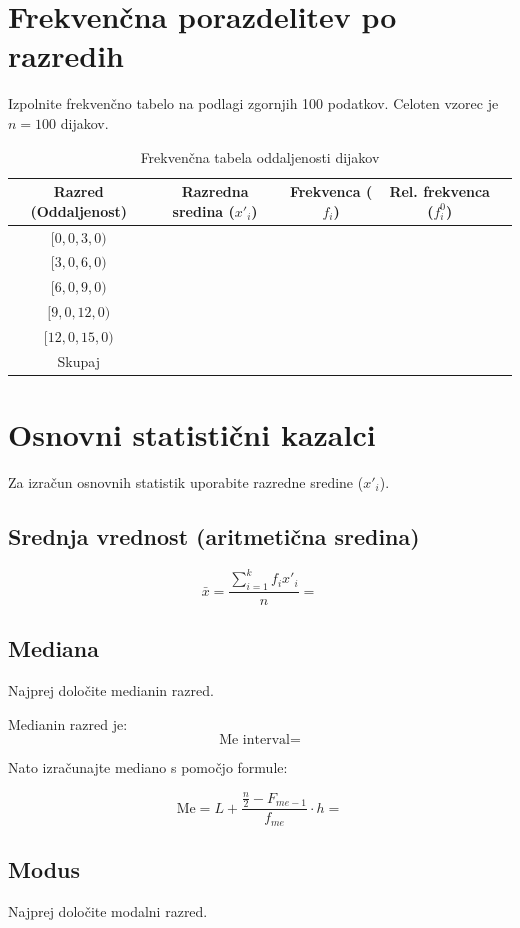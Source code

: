 \documentclass[12pt,a4paper]{article}
\begin{document}
\section{Frekvenčna porazdelitev po razredih}

Izpolnite frekvenčno tabelo na podlagi zgornjih 100 podatkov. Celoten vzorec je $n=100$ dijakov.

\begin{table}[h]
\centering
\caption{Frekvenčna tabela oddaljenosti dijakov}
\begin{tabular}{ccccc}
\toprule
Razred (Oddaljenost)& Razredna sredina ($x'_i$) & Frekvenca ($f_i$) & Rel. frekvenca ($f_i^0$) \\
\midrule
$[0,0, 3,0)$ &  &  &  & \\
\midrule
$[3,0, 6,0)$ &  &  &  & \\
\midrule
$[6,0, 9,0)$ &  &  &  & \\
\midrule
$[9,0, 12,0)$ &  &  &  & \\
\midrule
$[12,0, 15,0)$&  &  &  & \\
\midrule
Skupaj   & \phantom{100} & & \\
\bottomrule
\end{tabular}
\end{table}

\section{Osnovni statistični kazalci}
Za izračun osnovnih statistik uporabite razredne sredine ($x'_i$).

\subsection{Srednja vrednost (aritmetična sredina)}

$$\bar{x} = \dfrac{\sum_{i=1}^{k}f_i x'_i}{n} = 
$$

\subsection{Mediana}
Najprej določite medianin razred.

Medianin razred je:
$$\text{Me interval} = 
$$

Nato izračunajte mediano s pomočjo formule:

$$ \text{Me} = L + \frac{\frac{n}{2} - F_{me-1}}{f_{me}} \cdot h = $$


\subsection{Modus}
Najprej določite modalni razred.
\end{document}
